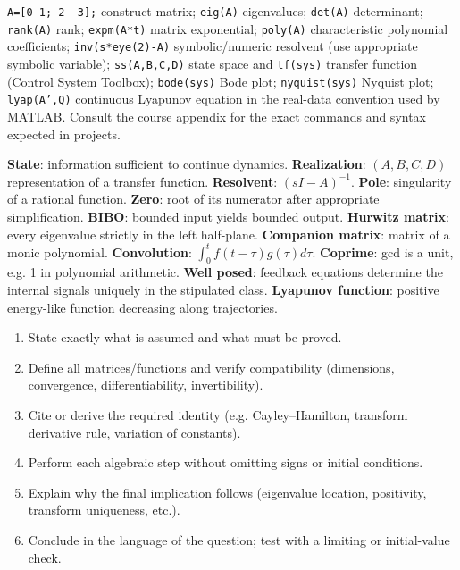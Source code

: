 \documentclass[10pt,a4paper]{article}
\begin{document}
\begin{formbox}[title={MATLAB QUICK COMMANDS}]
\texttt{A=[0 1;-2 -3];} construct matrix; \texttt{eig(A)} eigenvalues; \texttt{det(A)} determinant; \texttt{rank(A)} rank; \texttt{expm(A*t)} matrix exponential; \texttt{poly(A)} characteristic polynomial coefficients; \texttt{inv(s*eye(2)-A)} symbolic/numeric resolvent (use appropriate symbolic variable); \texttt{ss(A,B,C,D)} state space and \texttt{tf(sys)} transfer function (Control System Toolbox); \texttt{bode(sys)} Bode plot; \texttt{nyquist(sys)} Nyquist plot; \texttt{lyap(A',Q)} continuous Lyapunov equation in the real-data convention used by MATLAB. Consult the course appendix for the exact commands and syntax expected in projects.
\end{formbox}
\begin{defbox}[title={GLOSSARY}]
\textbf{State}: information sufficient to continue dynamics. \textbf{Realization}: $(A,B,C,D)$ representation of a transfer function. \textbf{Resolvent}: $(sI-A)^{-1}$. \textbf{Pole}: singularity of a rational function. \textbf{Zero}: root of its numerator after appropriate simplification. \textbf{BIBO}: bounded input yields bounded output. \textbf{Hurwitz matrix}: every eigenvalue strictly in the left half-plane. \textbf{Companion matrix}: matrix of a monic polynomial. \textbf{Convolution}: $\int_0^t f(t-\tau)g(\tau)d\tau$. \textbf{Coprime}: gcd is a unit, e.g. 1 in polynomial arithmetic. \textbf{Well posed}: feedback equations determine the internal signals uniquely in the stipulated class. \textbf{Lyapunov function}: positive energy-like function decreasing along trajectories.
\end{defbox}
\begin{exambox}[title={HIGH-MARK PROOF STRUCTURE}]
\begin{enumerate}[leftmargin=5mm,noitemsep]
\item State exactly what is assumed and what must be proved.
\item Define all matrices/functions and verify compatibility (dimensions, convergence, differentiability, invertibility).
\item Cite or derive the required identity (e.g. Cayley--Hamilton, transform derivative rule, variation of constants).
\item Perform each algebraic step without omitting signs or initial conditions.
\item Explain why the final implication follows (eigenvalue location, positivity, transform uniqueness, etc.).
\item Conclude in the language of the question; test with a limiting or initial-value check.
\end{enumerate}
\end{exambox}
\end{document}
